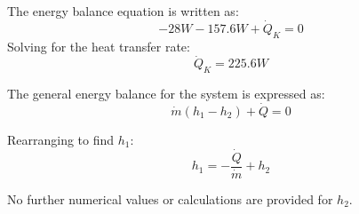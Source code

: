 The energy balance equation is written as:  
\[
-28W - 157.6W + \dot{Q}_K = 0
\]  
Solving for the heat transfer rate:  
\[
\dot{Q}_K = 225.6W
\]  

The general energy balance for the system is expressed as:  
\[
\dot{m}(h_1 - h_2) + \dot{Q} = 0
\]  

Rearranging to find \( h_1 \):  
\[
h_1 = -\frac{\dot{Q}}{\dot{m}} + h_2
\]  

No further numerical values or calculations are provided for \( h_2 \).